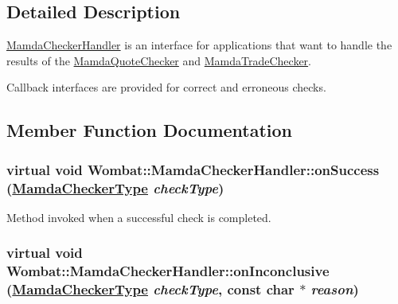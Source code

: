 \subsection{Detailed Description}
\hyperlink{classWombat_1_1MamdaCheckerHandler}{Mamda\-Checker\-Handler} is an interface for applications that want to handle the results of the \hyperlink{classWombat_1_1MamdaQuoteChecker}{Mamda\-Quote\-Checker} and \hyperlink{classWombat_1_1MamdaTradeChecker}{Mamda\-Trade\-Checker}. 

Callback interfaces are provided for correct and erroneous checks. 



\subsection{Member Function Documentation}
\hypertarget{classWombat_1_1MamdaCheckerHandler_84a0fdc7401c71483159eff705b4a290}{
\subsubsection[onSuccess]{\setlength{\rightskip}{0pt plus 5cm}virtual void Wombat::Mamda\-Checker\-Handler::on\-Success (\hyperlink{namespaceWombat_f4416a38ea95baf743f07d19ac9b6a4a}{Mamda\-Checker\-Type} {\em check\-Type})}}
\label{classWombat_1_1MamdaCheckerHandler_84a0fdc7401c71483159eff705b4a290}


Method invoked when a successful check is completed. 

\hypertarget{classWombat_1_1MamdaCheckerHandler_ee8b075a8d39a266787d6262a8346ea5}{
\subsubsection[onInconclusive]{\setlength{\rightskip}{0pt plus 5cm}virtual void Wombat::Mamda\-Checker\-Handler::on\-Inconclusive (\hyperlink{namespaceWombat_f4416a38ea95baf743f07d19ac9b6a4a}{Mamda\-Checker\-Type} {\em check\-Type}, const char $\ast$ {\em reason})}}
\label{classWombat_1_1MamdaCheckerHandler_ee8b075a8d39a266787d6262a8346ea5}


